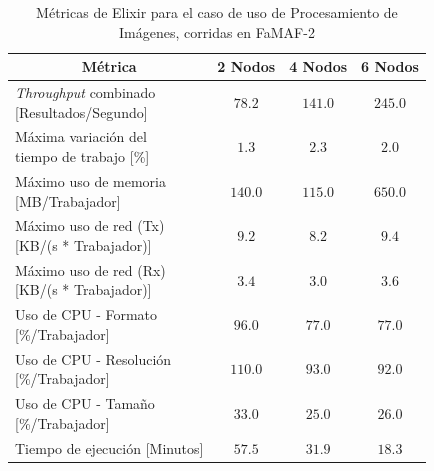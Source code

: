 \documentclass[11pt]{article}
\providecommand{\row}[1]{\parbox{150pt}{\setlength{\baselineskip}{0.2\baselineskip}\strut#1\strut}}
\newcommand{\ipcap}[2]{\caption{Métricas de #1 para el caso de uso de Procesamiento de Imágenes, corridas en #2}}
\newcommand{\english}[1]{\textit{#1}}
\begin{document}
\begin{table}[H]
\centering
\begin{tabular}{|l|c|c|c|}
\hline
\multicolumn{1}{|c|}{Métrica} & 2 Nodos & 4 Nodos & 6 Nodos \\ \hline
\row{\english{Throughput} combinado\\{[Resultados/Segundo]}} & $78.2$ & $141.0$ & $245.0$ \\ \hline
\row{Máxima variación del\\tiempo de trabajo [\%]} & $1.3$ & $2.3$ & $2.0$ \\ \hline
\row{Máximo uso de memoria\\{[MB/Trabajador]}} & $140.0$ & $115.0$ & $650.0$ \\ \hline
\row{Máximo uso de red (Tx)\\{[KB/(s * Trabajador)]}} & $9.2$ & $8.2$ & $9.4$ \\ \hline
\row{Máximo uso de red (Rx)\\{[KB/(s * Trabajador)]}} & $3.4$ & $3.0$ & $3.6$ \\ \hline
\row{Uso de CPU - Formato\\ {[\%/Trabajador]}} & $96.0$ & $77.0$ & $77.0$ \\ \hline
\row{Uso de CPU - Resolución\\ {[\%/Trabajador]}} & $110.0$ & $93.0$ & $92.0$ \\ \hline
\row{Uso de CPU - Tamaño\\ {[\%/Trabajador]}} & $33.0$ & $25.0$ & $26.0$ \\ \hline
Tiempo de ejecución {[Minutos]} & $57.5$ & $31.9$ & $18.3$ \\ \hline
\end{tabular}
\ipcap{Elixir}{FaMAF-2}
\end{table}
\end{document}
